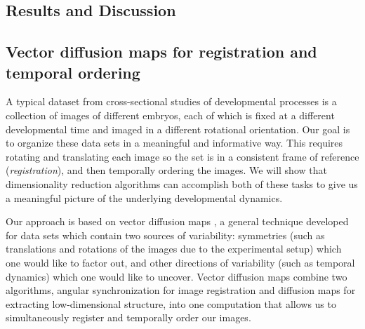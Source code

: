 \documentclass{pnastwo}
\begin{document}
\begin{article}
%
%
%
%


\section{Results and Discussion}

\subsection{Vector diffusion maps for registration and temporal ordering}

A typical dataset from cross-sectional studies of developmental processes is a collection of images of different embryos, each of which is fixed at a different developmental time and imaged in a different rotational orientation.
%
Our goal is to organize these data sets in a meaningful and informative way.
%
This requires rotating and translating each image so the set is in a consistent frame of reference ({\it registration}), and then temporally ordering the images. 
%
We will show that dimensionality reduction algorithms can accomplish both of these tasks to give us a meaningful picture of the underlying developmental dynamics. 

Our approach is based on vector diffusion maps \cite{singer2012vector}, a general technique developed for data sets which contain two sources of variability:
symmetries (such as translations and rotations of the images due to the experimental setup) which one would like to factor out, and other directions of variability (such as temporal dynamics) which one would like to uncover.
%
Vector diffusion maps combine two algorithms, angular synchronization \cite{singer2011angular} for image registration and diffusion maps \cite{coifman2005geometric} for extracting low-dimensional structure, into one computation that allows us to simultaneously register and temporally order our images. 
%


\end{article}
\end{document}
